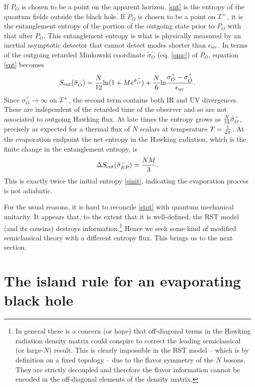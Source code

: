 \documentclass[11pt,oneside,letterpaper]{article}
\newcommand{\be}{\begin{equation}}
\newcommand{\ee}{\end{equation}}
\def\be{\begin{eqnarray}}
\def\ee{\end{eqnarray}}
\let\s=\sigma \let\t=\tau \let\u=\upsilon \let\c=\chi
\def\be{\begin{equation}}
\def\ee{\end{equation}}
\def\m{{M}}
\def\euv{\epsilon_{\rm uv}}
\def\log{{\rm ln}}
\numberwithin{equation}{section}
\def \be {\begin{equation}}
\def \ee {\end{equation}}
\begin{document}
If $P_O$ is chosen to be a point on the apparent horizon, \eqref{snt} is the entropy of the quantum fields outside the black hole. If $P_O$ is chosen to be a point on ${\cal I}^+$, 
it is the entanglement entropy of the portion of the outgoing state prior to $P_O$ with that after $P_O$. This entanglement entropy is what is physically measured by an inertial asymptotic detector that cannot detect modes shorter than $\euv$. In terms of the outgoing retarded Minkowski coordinate $\tilde \s^-_O$ (eq. \eqref{omc}) of $P_O$, equation \eqref{snt} becomes 
\be\label{sep}S_{\rm ent}(\tilde \s^-_O)=  {N \over 12}\log(1+\m e^{\tilde \s^-_O})+{N \over 6}\log{\s^+_O-\s^+_{\bar O} \over \euv}.\ee
Since $\s^+_O\to \infty$ on ${\cal I}^+$, the second term contains both IR and UV  divergences. These are independent of the retarded time of the observer and so are not
associated to outgoing Hawking  flux.  
At late times the entropy grows as ${N\over 12}\tilde \s^-_O$, precisely as expected for a thermal flux of $N$
scalars at temperature $T={1 \over 2\pi}$. At the evaporation endpoint the net entropy in the Hawking radiation, which is the finite change in the entanglement entropy,  is
\be \label{stot} \Delta S_{\rm ent}(\tilde \s^-_{EP})=  {N M\over 3}.\ee
This is exactly twice the initial entropy \eqref{sinit}, indicating the evaporation process is not adiabatic. 

For the usual reasons, it is hard to reconcile \eqref{stot} with quantum mechanical unitarity. It appears that, to the extent that it is well-defined, the RST model (and its cousins) destroys information.\footnote{In general there is a concern (or hope) that off-diagonal terms in the Hawking radiation density matrix  could conspire to correct the leading semiclassical (or large-$N$) result. This is clearly impossible in the RST model -- which is by definition on a fixed topology -- due to the flavor symmetry of the $N$ bosons. They are strictly decoupled and therefore the flavor information cannot be encoded in the off-diagonal elements of the density matrix. } Hence we seek some kind of modified semiclassical theory with a different entropy flux. This brings us to the next section. 

\section{The island rule for an evaporating black hole }
\end{document}
